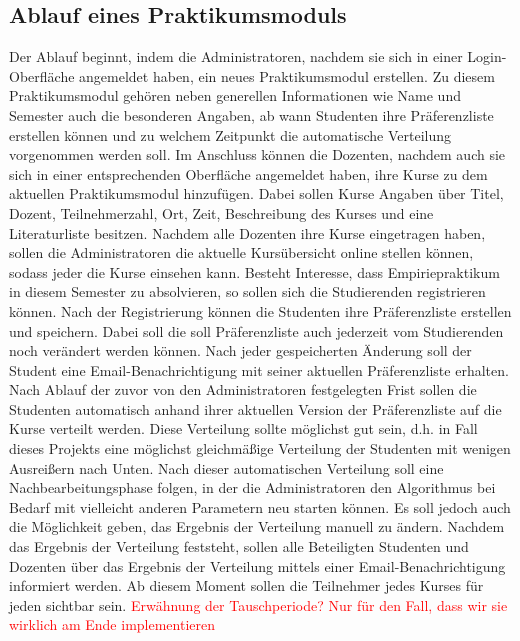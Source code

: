     \subsection{Ablauf eines Praktikumsmoduls}
        Der Ablauf beginnt, indem die Administratoren, nachdem sie sich in einer Login-Oberfläche angemeldet haben, ein neues Praktikumsmodul erstellen.
        Zu diesem Praktikumsmodul gehören neben generellen Informationen wie Name und Semester auch die besonderen Angaben, ab wann Studenten ihre Präferenzliste erstellen können und zu welchem Zeitpunkt die automatische Verteilung vorgenommen werden soll.
        Im Anschluss können die Dozenten, nachdem auch sie sich in einer entsprechenden Oberfläche angemeldet haben, ihre Kurse zu dem aktuellen Praktikumsmodul hinzufügen.
        Dabei sollen Kurse Angaben über Titel, Dozent, Teilnehmerzahl, Ort, Zeit, Beschreibung des Kurses und eine Literaturliste besitzen.
        Nachdem alle Dozenten ihre Kurse eingetragen haben, sollen die Administratoren die aktuelle Kursübersicht online stellen können, sodass jeder die Kurse einsehen kann.
        Besteht Interesse, dass Empiriepraktikum in diesem Semester zu absolvieren, so sollen sich die Studierenden registrieren können.
        Nach der Registrierung können die Studenten ihre Präferenzliste erstellen und speichern.
        Dabei soll die soll Präferenzliste auch jederzeit vom Studierenden noch verändert werden können.
        Nach jeder gespeicherten Änderung soll der Student eine Email-Benachrichtigung mit seiner aktuellen Präferenzliste erhalten.
        Nach Ablauf der zuvor von den Administratoren festgelegten Frist sollen die Studenten automatisch anhand ihrer aktuellen Version der Präferenzliste auf die Kurse verteilt werden.
        Diese Verteilung sollte möglichst gut sein, d.h. in Fall dieses Projekts eine möglichst gleichmäßige Verteilung der Studenten mit wenigen Ausreißern nach Unten.
        Nach dieser automatischen Verteilung soll eine Nachbearbeitungsphase folgen, in der die Administratoren den Algorithmus bei Bedarf mit vielleicht anderen Parametern neu starten können.
        Es soll jedoch auch die Möglichkeit geben, das Ergebnis der Verteilung manuell zu ändern.
        Nachdem das Ergebnis der Verteilung feststeht, sollen alle Beteiligten Studenten und Dozenten über das Ergebnis der Verteilung mittels einer Email-Benachrichtigung informiert werden.
        Ab diesem Moment sollen die Teilnehmer jedes Kurses für jeden sichtbar sein.
        \textcolor{red}{Erwähnung der Tauschperiode? Nur für den Fall, dass wir sie wirklich am Ende implementieren}
        
